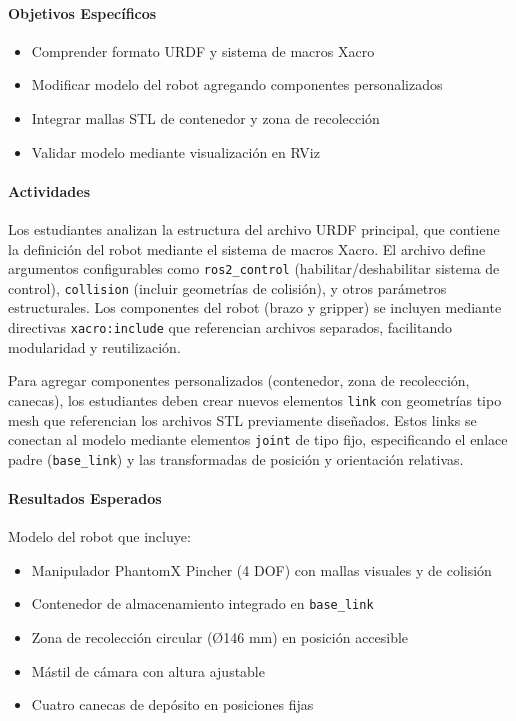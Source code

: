 \paragraph{Objetivos Específicos}
\begin{itemize}
    \item Comprender formato URDF y sistema de macros Xacro
    \item Modificar modelo del robot agregando componentes personalizados
    \item Integrar mallas STL de contenedor y zona de recolección
    \item Validar modelo mediante visualización en RViz
\end{itemize}

\paragraph{Actividades}

Los estudiantes analizan la estructura del archivo URDF principal, que contiene la definición del robot mediante el sistema de macros Xacro. El archivo define argumentos configurables como \texttt{ros2\_control} (habilitar/deshabilitar sistema de control), \texttt{collision} (incluir geometrías de colisión), y otros parámetros estructurales. Los componentes del robot (brazo y gripper) se incluyen mediante directivas \texttt{xacro:include} que referencian archivos separados, facilitando modularidad y reutilización.

Para agregar componentes personalizados (contenedor, zona de recolección, canecas), los estudiantes deben crear nuevos elementos \texttt{link} con geometrías tipo mesh que referencian los archivos STL previamente diseñados. Estos links se conectan al modelo mediante elementos \texttt{joint} de tipo fijo, especificando el enlace padre (\texttt{base\_link}) y las transformadas de posición y orientación relativas.

\paragraph{Resultados Esperados}

Modelo del robot que incluye:
\begin{itemize}
    \item Manipulador PhantomX Pincher (4 DOF) con mallas visuales y de colisión
    \item Contenedor de almacenamiento integrado en \texttt{base\_link}
    \item Zona de recolección circular (Ø146 mm) en posición accesible
    \item Mástil de cámara con altura ajustable
    \item Cuatro canecas de depósito en posiciones fijas
\end{itemize}

